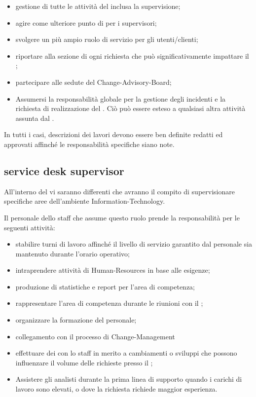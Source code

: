 \begin{itemize}
\item{gestione di tutte le attività del  inclusa la supervisione;}
\item{agire come ulteriore punto di  per i supervisori;}
\item{svolgere un più ampio ruolo di servizio per gli utenti/clienti;}
\item{riportare alla sezione di  ogni richiesta che può significativamente impattare il ;}
\item{partecipare alle sedute del \ac{Change-Advisory-Board};}
\item{Assumersi la responsabilità globale per la gestione degli incidenti e la richiesta di realizzazione del . Ciò può essere esteso a qualsiasi altra attività assunta dal .}
\end{itemize}

In tutti i casi, descrizioni dei lavori devono essere ben definite redatti ed approvati affinché le responsabilità specifiche siano note.

\subsection[Service Desk Supervisor]{service desk supervisor}
\label{sd-sd-supervisor}
All'interno del  vi saranno differenti  che avranno il compito di supervisionare specifiche aree dell'ambiente \acs{Information-Technology}.

Il personale dello staff che assume questo ruolo prende la responsabilità per le seguenti attività:

\begin{itemize}
\item{stabilire turni di lavoro affinché il livello di servizio garantito dal personale sia mantenuto durante l'orario operativo;}
\item{intraprendere attività di \ac{Human-Resources} in base alle esigenze;}
\item{produzione di statistiche e report per l'area di competenza;}
\item{rappresentare l'area di competenza durante le riunioni con il ;}
\item{organizzare la formazione del personale;}
\item{collegamento con il processo di \ac{Change-Management}}
\item{effettuare dei  con lo staff in merito a cambiamenti o sviluppi che possono influenzare il volume delle richieste presso il ;}
\item{Assistere gli analisti durante la prima linea di supporto quando i carichi di lavoro sono elevati, o dove la richiesta richiede maggior esperienza.}
\end{itemize}

